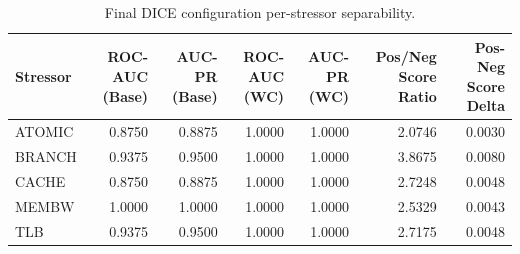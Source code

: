 \begin{table}[t]
\centering
\caption{Final DICE configuration per-stressor separability.}
\label{tab:dice_full_stressor}
\footnotesize
\begin{tabular}{lrrrrrr}
\toprule
Stressor & ROC-AUC (Base) & AUC-PR (Base) & ROC-AUC (WC) & AUC-PR (WC) & Pos/Neg Score Ratio & Pos-Neg Score Delta \\
\midrule
ATOMIC & 0.8750 & 0.8875 & 1.0000 & 1.0000 & 2.0746 & 0.0030 \\
BRANCH & 0.9375 & 0.9500 & 1.0000 & 1.0000 & 3.8675 & 0.0080 \\
CACHE & 0.8750 & 0.8875 & 1.0000 & 1.0000 & 2.7248 & 0.0048 \\
MEMBW & 1.0000 & 1.0000 & 1.0000 & 1.0000 & 2.5329 & 0.0043 \\
TLB & 0.9375 & 0.9500 & 1.0000 & 1.0000 & 2.7175 & 0.0048 \\
\bottomrule
\end{tabular}

\end{table}
